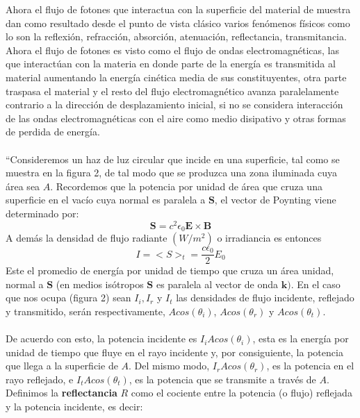 \documentclass[12]{article}
\begin{document}
\begin{multicols}{2}
Ahora el flujo de fotones que interactua con la superficie del material de muestra dan como resultado desde el punto de vista clásico varios fenómenos físicos como lo son  la reflexión, refracción, absorción, atenuación, reflectancia, transmitancia.  Ahora el flujo de fotones  es  visto como el flujo de ondas electromagnéticas,   las que interactúan con la materia  en donde parte de la energía es transmitida al material aumentando la energía cinética media de sus constituyentes, otra parte traspasa el material y el resto del flujo electromagnético avanza paralelamente contrario a la dirección de desplazamiento inicial, si no se considera interacción de las ondas electromagnéticas con el aire como medio disipativo  y otras formas de perdida de energía.\\\\
``Consideremos un haz de luz circular que incide en una superficie, tal como se muestra en la figura 2, de tal modo que se produzca una zona iluminada cuya área sea $A$. Recordemos que la potencia por unidad de área que cruza una superficie en el vacío cuya normal es paralela a $\textbf{S}$, el vector de Poynting  viene determinado por:
\begin{equation}
\textbf{S} = c^{2} \epsilon_{0}\textbf{E}\times \textbf{B}
\end{equation}
A demás la densidad de flujo radiante $(W / m^{2})$ o irradiancia es entonces 
\begin{equation}
I =  < S >_{t}   = \frac{c \epsilon_{0}}{2} E_{0}
\end{equation}
Este el promedio de energía por unidad de tiempo que cruza  un área unidad, normal a  $\textbf{S}$ (en medios isótropos $\textbf{S}$ es paralela al vector de onda $\textbf{k})$. En el caso que nos ocupa (figura 2) sean $I_{i} , I_{r}$ y $I_{t}$ las densidades de flujo incidente, reflejado y transmitido, serán respectivamente, $A cos(\theta _{i})$, $A cos(\theta _{r})$ y $A cos(\theta _{t})$.\\ \\
De acuerdo con esto, la potencia incidente es $I_{i} A cos(\theta_{i})$, esta es la energía por unidad de tiempo que fluye en el rayo incidente y, por consiguiente, la potencia que llega a la superficie de $A$. Del mismo modo,  $I_{r} A cos(\theta_{r})$, es la potencia en el rayo reflejado, e $I_{t} A cos(\theta_{t})$, es la potencia que se transmite a través de $A$. Definimos la \textbf{reflectancia} $R$ como el cociente entre la potencia (o flujo) reflejada y la potencia incidente, es decir:
\begin{equation}

\end{equation}
\end{multicols}
\end{document}
